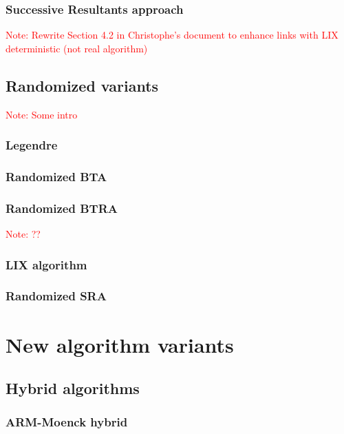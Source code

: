 \documentclass{article}
\newcounter{algo}
\newcommand{\Notes}[1]{\textcolor{red}{Note: #1}}
\begin{document}
\subsubsection{Successive Resultants approach}
\label{sec:LIX}
\Notes{Rewrite Section 4.2 in Christophe's document to enhance links with LIX deterministic (not real algorithm)}



\subsection{Randomized variants}
\label{sec:randomized-variants}

\Notes{Some intro}

\subsubsection{Legendre}
\label{sec:legendre}

\subsubsection{Randomized BTA}
\label{sec:BTArand}

\subsubsection{Randomized BTRA}
\label{sec:BTRArand}
\Notes{??}

\subsubsection{LIX algorithm}
\label{sec:LIXrand}

\subsubsection{Randomized SRA}
\label{sec:SRArand}




\section{New algorithm variants}
\label{sec:new-variants}

\subsection{Hybrid algorithms}
\label{sec:hybrid-algorithms}

\subsubsection{ARM-Moenck hybrid}
\end{document}
